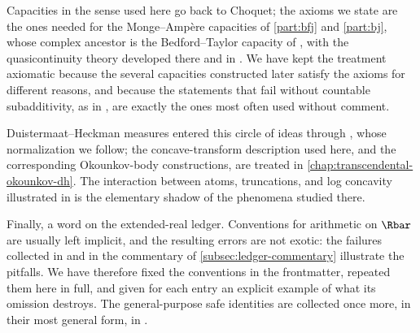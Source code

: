Capacities in the sense used here go back to Choquet; the axioms we state are
the ones needed for the Monge--Amp\`ere capacities of \cref{part:bfj} and
\cref{part:bj}, whose complex ancestor is the Bedford--Taylor capacity of
\cite{BT82}, with the quasicontinuity theory developed there and in
\cite{GZ17}.  We have kept the treatment axiomatic because the several
capacities constructed later satisfy the axioms for different reasons, and
because the statements that fail without countable subadditivity, as in
, are exactly the ones most often used
without comment.

Duistermaat--Heckman measures entered this circle of ideas through
\cite{BHJ17}, whose normalization we follow; the concave-transform description
used here, and the corresponding Okounkov-body constructions, are treated in
\cref{chap:transcendental-okounkov-dh}.  The interaction between atoms,
truncations, and log concavity illustrated in
 is the elementary shadow of
the phenomena studied there.

Finally, a word on the extended-real ledger.  Conventions for arithmetic on
$\Rbar$ are usually left implicit, and the resulting errors are not exotic:
the failures collected in  and in the
commentary of \cref{subsec:ledger-commentary} illustrate the pitfalls.  We
have therefore fixed the conventions in the frontmatter, repeated them here in
full, and given for each entry an explicit example of what its omission
destroys.  The general-purpose safe identities are collected once more, in
their most general form, in .
